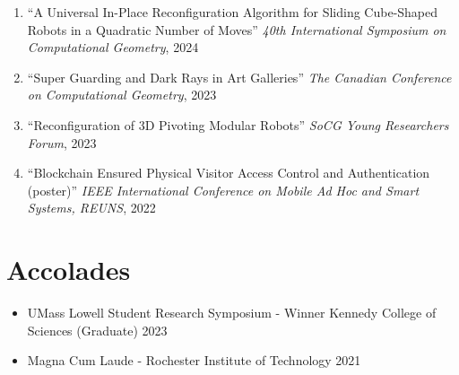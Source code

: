 \documentclass[letterpaper,11pt]{article}
\makeatletter
\newcommand{\resumeSubHeadingListStart}{\begin{itemize}[leftmargin=*]}
\newcommand{\resumeSubHeadingListEnd}{\end{itemize}}
\newcommand{\resumeSubheading}[4]{%
  \item[]%
  \begin{tabularx}{\textwidth}{>{\raggedright\arraybackslash}X@{\hspace{0.5em}}r}
    {\bfseries{\textsc{#1}}} & #2 \\[2pt]
    {\small #3}               & {\small #4} \\
  \end{tabularx}%
}
\newcommand{\presentation}[3]{
  \item ``#1'' %
     \emph{#2}, %
      #3%


}
\newcommand{\resumeOneLine}[2]{%
  \item[] #1 #2
}
\newcommand{\pdficon}{\faFilePdf}
\makeatother
\begin{document}
\begin{enumerate}
  \presentation{A Universal In-Place Reconfiguration Algorithm for Sliding Cube-Shaped Robots in a Quadratic Number of Moves}{40th International Symposium on Computational Geometry}{2024} \vspace{-.5em}  
  \presentation{Super Guarding and Dark Rays in Art Galleries}{The Canadian Conference on Computational Geometry}{2023} \vspace{-.5em}  
  \presentation{Reconfiguration of 3D Pivoting Modular Robots}{SoCG Young Researchers Forum}{2023} \vspace{-.5em}  
  \presentation{Blockchain Ensured Physical Visitor Access Control and Authentication (poster)}{IEEE International Conference on Mobile Ad Hoc and Smart Systems, REUNS}{2022} 
\end{enumerate}

\section{Accolades}
\resumeSubHeadingListStart
  \resumeOneLine{UMass Lowell Student Research Symposium - Winner Kennedy College of Sciences (Graduate)}{2023}
  \resumeOneLine{Magna Cum Laude -  Rochester Institute of Technology}{2021}
\resumeSubHeadingListEnd
\end{document}
